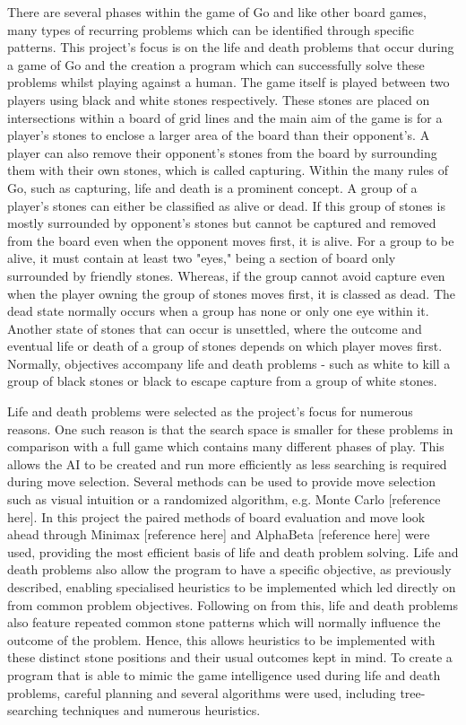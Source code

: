\documentclass{l3proj}
\begin{document}
There are several phases within the game of Go and like other board games, many types of recurring problems which can be identified through specific patterns. This project's focus is on the life and death problems that occur during a game of Go and the creation a program which can successfully solve these problems whilst playing against a human. The game itself is played between two players using black and white stones respectively. These stones are placed on intersections within a board of grid lines and the main aim of the game is for a player's stones to enclose a larger area of the board than their opponent's. A player can also remove their opponent's stones from the board by surrounding them with their own stones, which is called capturing. Within the many rules of Go, such as capturing, life and death is a prominent concept. A group of a player's stones can either be classified as alive or dead. If this group of stones is mostly surrounded by opponent's stones but cannot be captured and removed from the board even when the opponent moves first, it is alive. For a group to be alive, it must contain at least two "eyes," being a section of board only surrounded by friendly stones. Whereas, if the group cannot avoid capture even when the player owning the group of stones moves first, it is classed as dead. The dead state normally occurs when a group has none or only one eye within it. Another state of stones that can occur is unsettled, where the outcome and eventual life or death of a group of stones depends on which player moves first. Normally, objectives accompany life and death problems - such as white to kill a group of black stones or black to escape capture from a group of white stones.

Life and death problems were selected as the project's focus for numerous reasons. One such reason is that the search space is smaller for these problems in comparison with a full game which contains many different phases of play.  This allows the AI to be created and run more efficiently as less searching is required during move selection. Several methods can be used to provide move selection such as visual intuition or a randomized algorithm, e.g. Monte Carlo [reference here]. In this project the paired methods of board evaluation and move look ahead through Minimax [reference here] and AlphaBeta [reference here] were used, providing the most efficient basis of life and death problem solving. Life and death problems also allow the program to have a specific objective, as previously described, enabling specialised heuristics to be implemented which led directly on from common problem objectives. Following on from this, life and death problems also feature repeated common stone patterns which will normally influence the outcome of the problem. Hence, this allows heuristics to be implemented with these distinct stone positions and their usual outcomes kept in mind. To create a program that is able to mimic the game intelligence used during life and death problems, careful planning and several algorithms were used, including tree-searching techniques and numerous heuristics.
\end{document}
